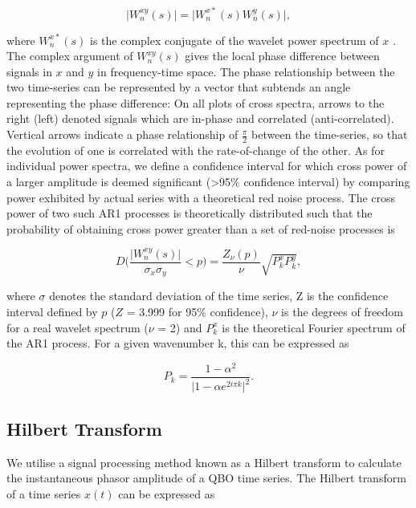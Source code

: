 \documentclass[wcd, manuscript]{copernicus}
\begin{document}
\begin{equation} \label{wavelet_cross}
\vert W^{xy}_n(s)\vert = \vert W^{x*}_n(s) W^{y}_n(s)\vert,
\end{equation}

where $W^{x*}_n(s)$ is the complex conjugate of the wavelet power spectrum of $x$ \citep{Grinstead2004}. The complex argument of $W^{xy}_n(s)$ gives the local phase difference between signals in $x$ and $y$ in frequency-time space. The phase relationship between the two time-series can be represented by a
vector that subtends an angle representing the phase difference: On all plots of cross spectra, arrows to the right (left) denoted signals which are in-phase and correlated (anti-correlated). Vertical arrows indicate a phase relationship of $\frac{\pi}{2}$ between the time-series, so that the evolution of
one is correlated with the rate-of-change of the other. As for individual power spectra, we define a confidence interval for which cross power of a larger amplitude is deemed significant (>95\% confidence interval) by comparing power exhibited by actual series with a theoretical red noise process. The cross power of two such AR1 processes is theoretically distributed such that the probability of obtaining cross power greater than a set of red-noise processes is

\begin{equation} \label{wavelet_cross_dist}
D\bigg(\frac{\vert W^{xy}_n(s)\vert}{\sigma_x \sigma_y} < p\bigg) = \frac{Z_\nu(p)}{\nu} \sqrt{P^x_k P^y_k},
\end{equation}

where $\sigma$ denotes the standard deviation of the time series, Z is the confidence interval defined by $p$ ($Z$ = 3.999 for 95\% confidence), $\nu$ is the degrees of freedom for a real wavelet spectrum ($\nu$ = 2) and $P^x_k$ is the theoretical Fourier spectrum of the AR1 process. For a given wavenumber k, this can be expressed as

\begin{equation} \label{theoretical_fourier}
P_k = \frac{1 - \alpha^2}{\vert 1 - \alpha e^{2i\pi k} \vert^2}.
\end{equation}

\subsection{Hilbert Transform}
We utilise a signal processing method known as a Hilbert transform to calculate the instantaneous phasor amplitude of a QBO time series. The Hilbert transform of a time series $x(t)$ can be expressed as
\end{document}
